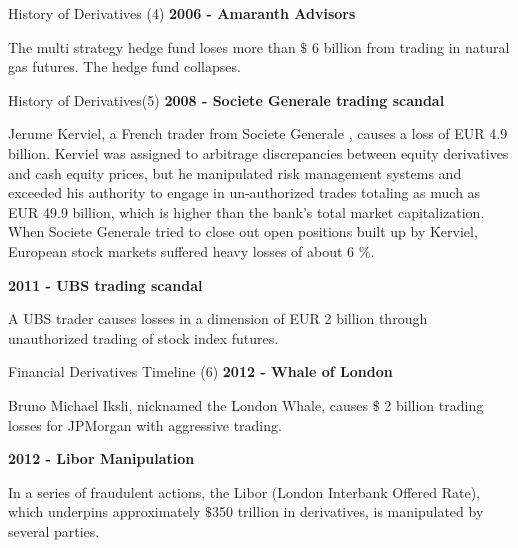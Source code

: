 


{History of Derivatives (4)}
\textbf{2006 - Amaranth Advisors}






	The multi strategy hedge fund loses more than $\$$ 6 billion from trading in natural gas futures. The hedge fund collapses.





{History of Derivatives(5)}
\textbf{2008 - Societe Generale trading scandal}






	Jerume Kerviel, a French trader from Societe Generale , causes a loss of EUR 4.9 billion. Kerviel was assigned to arbitrage discrepancies between equity derivatives and cash equity prices, but he manipulated risk management systems and exceeded his authority to engage in un-authorized trades totaling as much as EUR 49.9 billion, which is higher than the bank's total market capitalization. When Societe Generale  tried to close out open positions built up by Kerviel, European stock markets suffered heavy losses of about 6 $\%$.




\textbf{2011 - UBS trading scandal}






	A UBS trader causes losses in a dimension of EUR 2 billion through unauthorized trading of stock index futures.





{Financial Derivatives Timeline (6)}
\textbf{2012 - Whale of London}






	Bruno Michael Iksli, nicknamed the London Whale, causes $\$$ 2 billion trading losses for JPMorgan with aggressive trading.




\textbf{2012 - Libor Manipulation}






	In a series of fraudulent actions, the Libor (London Interbank Offered Rate), which underpins approximately $\$$350 trillion in derivatives, is manipulated by several parties.





